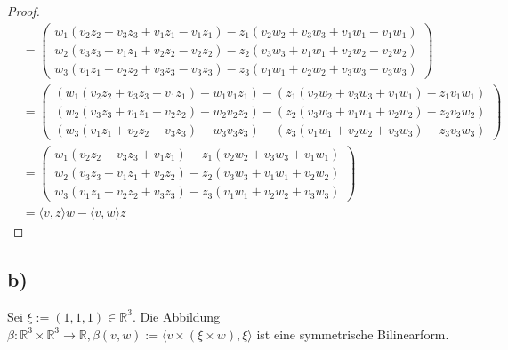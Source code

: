 \documentclass{article}
\newcommand{\RR}{\mathbb{R}}
\begin{document}
\begin{proof}
\[\begin{aligned}
        &=
        \begin{pmatrix}
            w_1(v_2  z_2 + v_3  z_3 + v_1  z_1 - v_1  z_1) - z_1(v_2 w_2  + v_3 w_3 + v_1  w_1 - v_1  w_1)  \\
            w_2(v_3  z_3 + v_1  z_1 + v_2  z_2 - v_2  z_2) - z_2(v_3 w_3  + v_1 w_1 + v_2  w_2 - v_2  w_2)  \\
            w_3(v_1  z_1 + v_2  z_2 + v_3  z_3 - v_3  z_3) - z_3(v_1 w_1  + v_2 w_2 + v_3  w_3 - v_3  w_3) 
        \end{pmatrix}  \\
        &=
        \begin{pmatrix}
            (w_1(v_2  z_2 + v_3  z_3 + v_1  z_1) - w_1 v_1  z_1) - (z_1(v_2 w_2  + v_3 w_3 + v_1  w_1) - z_1 v_1  w_1)  \\
            (w_2(v_3  z_3 + v_1  z_1 + v_2  z_2) - w_2 v_2  z_2) - (z_2(v_3 w_3  + v_1 w_1 + v_2  w_2) - z_2 v_2  w_2)  \\
            (w_3(v_1  z_1 + v_2  z_2 + v_3  z_3) - w_3 v_3  z_3) - (z_3(v_1 w_1  + v_2 w_2 + v_3  w_3) - z_3 v_3  w_3) 
        \end{pmatrix} \\
        &=
        \begin{pmatrix}
            w_1(v_2  z_2 + v_3  z_3 + v_1  z_1) - z_1(v_2 w_2  + v_3 w_3 + v_1  w_1) \\
            w_2(v_3  z_3 + v_1  z_1 + v_2  z_2) - z_2(v_3 w_3  + v_1 w_1 + v_2  w_2) \\
            w_3(v_1  z_1 + v_2  z_2 + v_3  z_3) - z_3(v_1 w_1  + v_2 w_2 + v_3  w_3) 
        \end{pmatrix} \\
        &=
        \langle v, z \rangle w - \langle v, w \rangle z
    \end{aligned}
    \]
    
 \end{proof}

 \newpage

 \subsection*{b)}
 Sei
 $\xi := (1,1,1) \in \RR^3$.
 Die Abbildung
 $\beta : \RR^3 \times \RR^3 \to \RR,
 \beta(v, w) := \langle v \times (\xi \times w), \xi \rangle$
 ist eine symmetrische Bilinearform.
\end{document}
